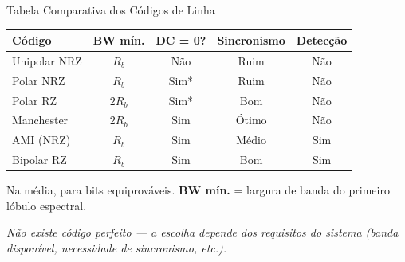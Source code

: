 \begin{frame}{Tabela Comparativa dos Códigos de Linha}
  \vspace{0.2cm}
  \begin{center}
  \renewcommand{\arraystretch}{1.3}
  \footnotesize
  \begin{tabular}{l c c c c}
    \hline
    \textbf{Código} & \textbf{BW mín.} & \textbf{DC = 0?} &
    \textbf{Sincronismo} & \textbf{Detecção} \\
    \hline
    Unipolar NRZ   & $R_b$    & Não  & Ruim   & Não \\
    Polar NRZ       & $R_b$    & Sim* & Ruim   & Não \\
    Polar RZ        & $2R_b$   & Sim* & Bom    & Não \\
    Manchester      & $2R_b$   & Sim  & Ótimo  & Não \\
    AMI (NRZ)       & $R_b$    & Sim  & Médio  & Sim \\
    Bipolar RZ      & $R_b$    & Sim  & Bom    & Sim \\
    \hline
  \end{tabular}
  \end{center}
  \vspace{0.2cm}
  {\footnotesize *Na média, para bits equiprováveis.
  \textbf{BW mín.} = largura de banda do primeiro lóbulo espectral.}

  \vspace{0.2cm}
  \textit{Não existe código perfeito — a escolha depende dos requisitos
  do sistema (banda disponível, necessidade de sincronismo, etc.).}
\end{frame}
